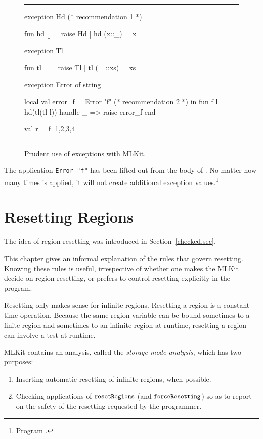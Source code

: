 \documentclass[12pt]{book}
\begin{document}
\begin{figure}
\hrule
\medskip
\begin{smlcode}
  exception Hd               (* recommendation 1 *)

  fun hd [] = raise Hd
    | hd (x::_) = x

  exception Tl

  fun tl [] = raise Tl
    | tl (_ ::xs) = xs

  exception Error of string

  local
    val error_f = Error "f"  (* recommendation 2 *)
  in
    fun f l =
        hd(tl(tl l)) handle _ => raise error_f
  end

  val r = f [1,2,3,4]
\end{smlcode}
\caption{Prudent use of exceptions with MLKit.\label{prudentexn.fig}}
\medskip
\hrule
\end{figure}

The application \lstinline!Error "f"! has been lifted out from the body of
. No matter how many times  is applied, it will not create
additional exception values.\footnote{Program .}

\chapter{Resetting Regions}
\label{storagemodes.sec}

The idea of region resetting was introduced in Section~\ref{checked.sec}.
%
%

This chapter gives an informal explanation of the rules that govern
resetting. Knowing these rules is useful, irrespective of whether one makes the
MLKit decide on region resetting, or prefers to control resetting explicitly in
the program.

Resetting only makes sense for infinite regions.  Resetting a region is a
constant-time operation.  Because the same region variable can be bound
sometimes to a finite region and sometimes to an infinite region at runtime,
resetting a region can involve a test at runtime.

MLKit contains an analysis, called the {\em storage mode analysis}, which
has two purposes:
\begin{enumerate}
\item Inserting automatic resetting of infinite regions, when possible.
\item Checking applications of $\mbox{\small\ttfamily resetRegions}$ (and
  $\mbox{\small\ttfamily forceResetting}$) so as to report on the safety of the resetting requested by the
  programmer.
\end{enumerate}
\end{document}
